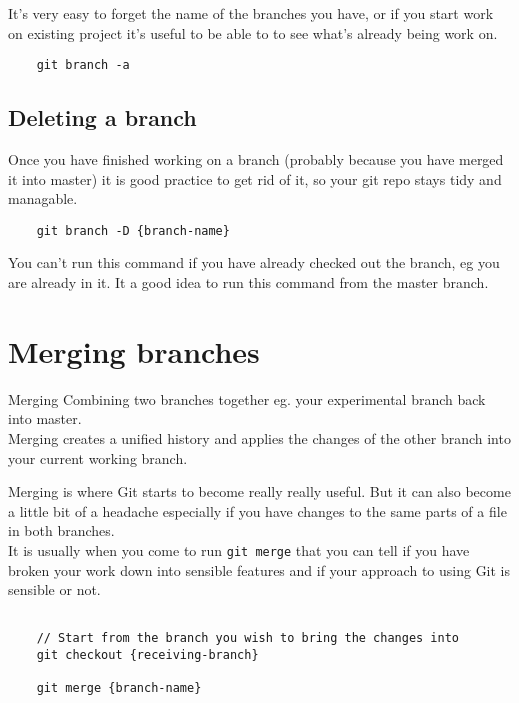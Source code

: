It's very easy to forget the name of the branches you have, or if you start work on existing project it's useful to be able to to see what's already being work on.

\begin{verbatim}
    git branch -a
\end{verbatim}


\subsection{Deleting a branch}

Once you have finished working on a branch (probably because you have merged it into master) it is good practice to get rid of it, so your git repo stays tidy and managable.
\\

\begin{verbatim}
    git branch -D {branch-name}
\end{verbatim}

You can't run this command if you have already checked out the branch, eg you are already in it. It a good idea to run this command from the master branch.

\section{Merging branches}

\begin{infobox}{Merging}
	Combining two branches together eg. your experimental branch back into master.
	\\ 
	
	Merging creates a unified history and applies the changes of the other branch into your current working branch.
\end{infobox}

Merging is where Git starts to become really really useful. But it can also become a little bit of a headache especially if you have changes to the same parts of a file in both branches.
\\

It is usually when you come to run \texttt{git merge} that you can tell if you have broken your work down into sensible features and if your approach to using Git is sensible or not.
\\

\begin{verbatim}

    // Start from the branch you wish to bring the changes into
    git checkout {receiving-branch}

    git merge {branch-name}
\end{verbatim}